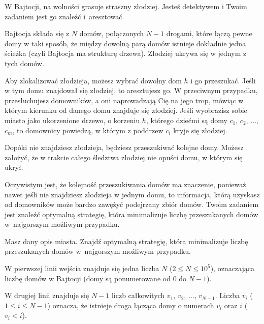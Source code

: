 

\usepackage[utf8]{inputenc}
\usepackage[T1]{fontenc}
\usepackage[polish]{babel}
\usepackage{polski}





W Bajtocji, na wolności grasuje straszny złodziej.
Jesteś detektywem i Twoim zadaniem jest go znaleźć i~aresztować.

Bajtocja składa się z $N$ domów, połączonych $N-1$ drogami,
	które łączą pewne domy w taki sposób, że między dowolną parą domów istnieje dokładnie jedna ścieżka
	(czyli Bajtocja ma strukturę drzewa).
Złodziej ukrywa się w jednym z tych domów.

Aby zlokalizować złodzieja, możesz wybrać dowolny dom $h$ i go przeszukać.
Jeśli w tym domu znajdował się złodziej, to aresztujesz go.
W przeciwnym przypadku, przesłuchujesz domowników, a oni naprowadzają Cię na jego trop,
	mówiąc w którym kierunku od danego domu znajduje się złodziej.
Jeśli wyobrazisz sobie miasto jako ukorzenione drzewo, o korzeniu $h$, którego dziećmi
	są domy $c_1$, $c_2$, $\ldots$, $c_m$, to domownicy powiedzą, w którym z poddrzew $c_i$
	kryje się złodziej.

Dopóki nie znajdziesz złodzieja, będziesz przeszukiwać kolejne domy.
Możesz założyć, że w trakcie całego śledztwa złodziej nie opuści domu, w którym się ukrył.

Oczywistym jest, że kolejność przeszukiwania domów ma znaczenie,
	ponieważ nawet jeśli nie znajdziesz złodzieja w jednym domu, to informacja, którą uzyskasz od domowników
	może bardzo zawężyć podejrzany zbiór domów.
Twoim zadaniem jest znaleźć optymalną strategię, która minimalizuje liczbę przeszukanych domów
	w~najgorszym możliwym przypadku.


Masz dany opis miasta.
Znajdź optymalną strategię, która minimalizuje liczbę przeszukanych domów w~najgorszym możliwym przypadku.


W pierwszej linii wejścia znajduje się jedna liczba $N$ ($2 \le N \le 10^5$), oznaczająca liczbę domów w Bajtocji
	(domy są ponumerowane od $0$ do $N-1$).

W drugiej linii znajduje się $N-1$ liczb całkowitych $v_1$, $v_2$, $\ldots$, $v_{N-1}$.
Liczba $v_i$ ($1 \le i \le N-1$) oznacza, że istnieje droga łącząca domy o numerach $v_i$ oraz $i$ ($v_i < i$).

